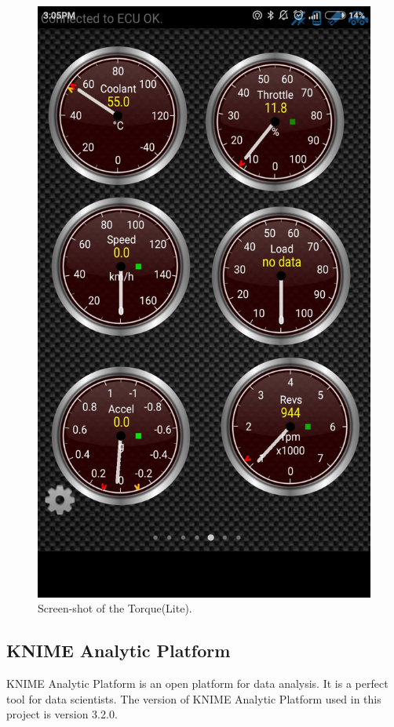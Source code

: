 \begin{figure}[hbt!]\centering
\includegraphics[height=.5\textheight]{image/torque}
\caption{Screen-shot of the Torque(Lite).}
\label{fig:torque}
\end{figure}

\subsection{KNIME Analytic Platform}
KNIME Analytic Platform is an open platform for data analysis. It is a perfect tool for data scientists. The version of KNIME Analytic Platform used in this project is version 3.2.0. 

